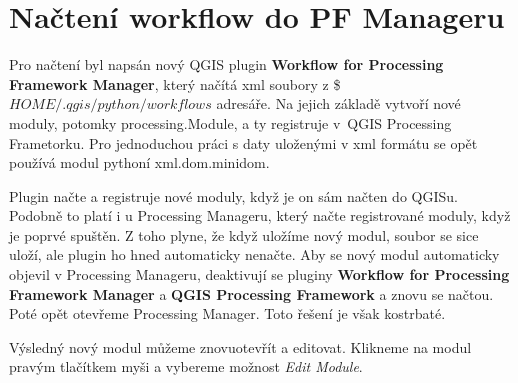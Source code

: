 \newpage
\section{Načtení workflow do PF Manageru}
Pro načtení byl napsán nový QGIS plugin \textbf{Workflow for
Processing Framework Manager}, který načítá xml soubory
z \$$HOME/.qgis/python/workflows$ adresáře. Na jejich základě vytvoří
nové moduly, potomky processing.Module, a ty registruje v~QGIS
Processing Frametorku. Pro jednoduchou práci s daty uloženými v xml
formátu se opět používá modul pythoní xml.dom.minidom.

Plugin načte a registruje nové moduly, když je on sám načten do
QGISu. Podobně to platí i u Processing Manageru, který načte
registrované moduly, když je poprvé spuštěn. Z toho plyne, že když
uložíme nový modul, soubor se sice uloží, ale plugin ho hned
automaticky nenačte. Aby se nový modul automaticky objevil v
Processing Manageru, deaktivují se pluginy \textbf{Workflow for
Processing Framework Manager} a \textbf{QGIS Processing Framework} a
znovu se načtou. Poté opět otevřeme Processing Manager. Toto řešení je
však kostrbaté.

Výsledný nový modul můžeme znovuotevřít a editovat. Klikneme na modul
pravým tlačítkem myši a vybereme možnost \textit{Edit Module}.
